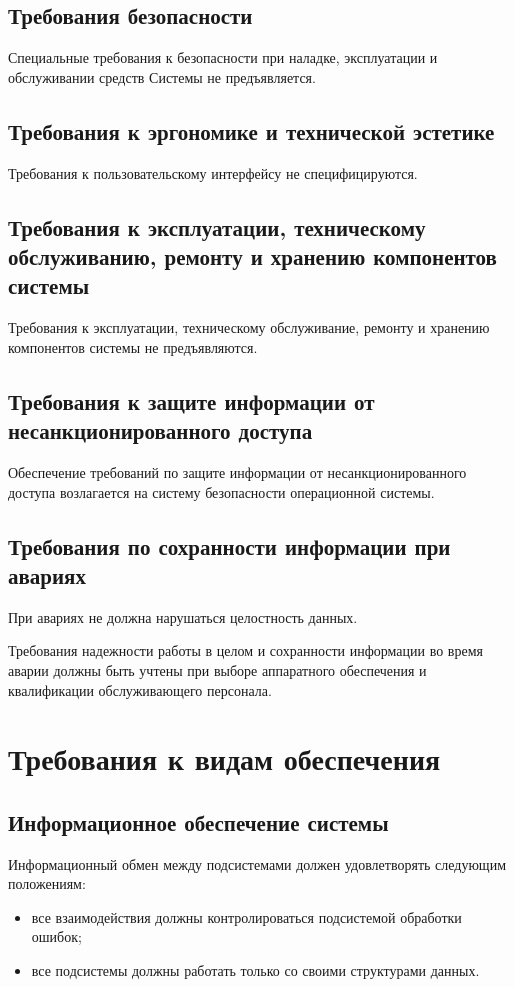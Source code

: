 \subsection{Требования безопасности}
Специальные требования к безопасности при наладке, эксплуатации и обслуживании
средств Системы не предъявляется.

\subsection{Требования к эргономике и технической эстетике}
Требования к пользовательскому интерфейсу не специфицируются.

\subsection{Требования к эксплуатации, техническому обслуживанию, ремонту и
хранению компонентов системы}
Требования к эксплуатации, техническому обслуживание, ремонту и хранению
компонентов системы не предъявляются.

\subsection{Требования к защите информации от несанкционированного доступа}
Обеспечение требований по защите информации от несанкционированного доступа
возлагается на систему безопасности операционной системы.

\subsection{Требования по сохранности информации при авариях}
При авариях не должна нарушаться целостность данных. 

Требования надежности работы в целом и сохранности информации во время аварии
должны быть учтены при выборе аппаратного обеспечения и квалификации
обслуживающего персонала.

\section{Требования к видам обеспечения}
\subsection{Информационное обеспечение системы}
Информационный обмен между подсистемами должен удовлетворять следующим
положениям:
\begin{itemize}
  \item все взаимодействия должны контролироваться подсистемой обработки
    ошибок;
  \item все подсистемы должны работать только со своими структурами данных.
\end{itemize}

